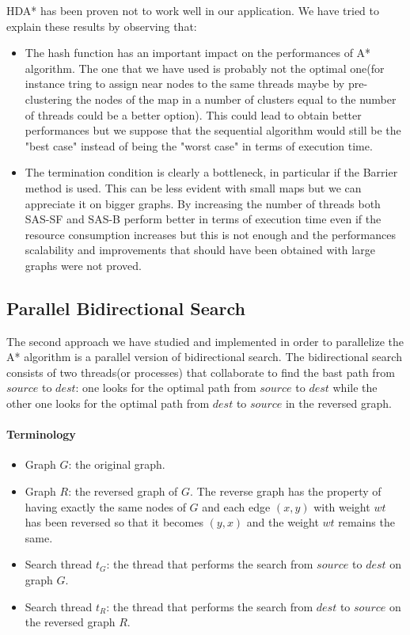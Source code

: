 \documentclass[twocolumn, switch]{article} %
\begin{document}
HDA* has been proven not to work well in our application. We have tried to explain these 
results by observing that:
\begin{itemize}
  \item The hash function has an important impact on the performances of A* algorithm. The one that
        we have used is probably not the optimal one(for instance tring to assign near nodes
        to the same threads maybe by pre-clustering the nodes of the map in a number of clusters
        equal to the number of threads could be a better option). This could lead to obtain better performances but we
        suppose that the sequential algorithm would still be the "best case" instead of being the "worst case"
        in terms of execution time. 
  \item The termination condition is clearly a bottleneck, in particular if the Barrier method
        is used. This can be less evident with small maps but we can appreciate it on bigger graphs.
        By increasing the number of threads both SAS-SF and SAS-B perform better in terms of execution time even if
        the resource consumption increases but this is not enough and the performances scalability
        and improvements that should have been obtained with large graphs were not proved.
\end{itemize}

\subsection{Parallel Bidirectional Search}
The second approach we have studied and implemented in order to parallelize the A* algorithm
is a parallel version of bidirectional search. The bidirectional search consists of two threads(or
processes) that collaborate to find the bast path from $source$ to $dest$: one looks for the optimal path
from $source$ to $dest$ while the other one looks for the optimal path from $dest$ to $source$ in the reversed graph.
\paragraph{Terminology}
\begin{itemize}
  \item Graph $G$: the original graph.
  \item Graph $R$: the reversed graph of $G$. The reverse graph has the property of having
        exactly the same nodes of $G$ and each edge $(x, y)$ with weight $wt$ has been
        reversed so that it becomes $(y, x)$ and the weight $wt$ remains the same.
  \item Search thread $t_G$: the thread that performs the search from $source$ to $dest$
        on graph $G$.
  \item Search thread $t_R$: the thread that performs the search from $dest$ to $source$
        on the reversed graph $R$.
\end{itemize}
\end{document}
